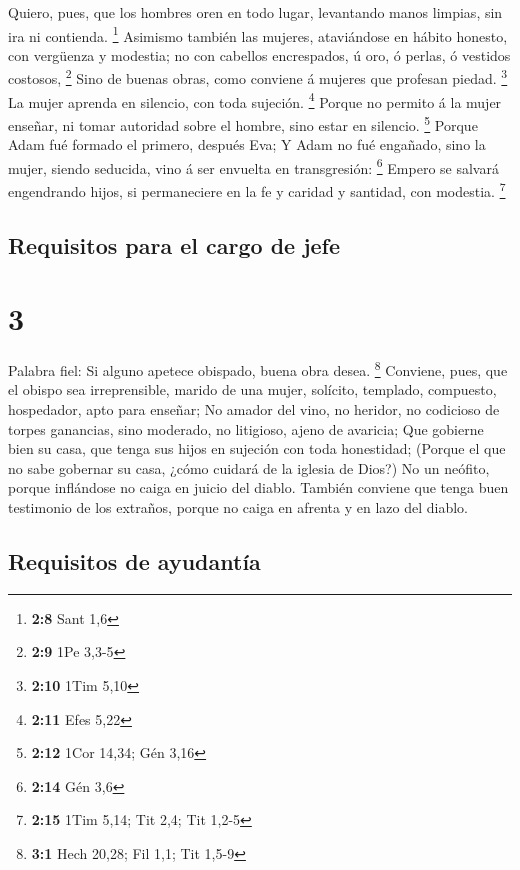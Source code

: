  Quiero, pues, que los hombres oren en todo lugar,
levantando manos limpias, sin ira ni contienda. \footnote{\textbf{2:8}
  Sant 1,6}  Asimismo también las mujeres, ataviándose en
hábito honesto, con vergüenza y modestia; no con cabellos encrespados, ú
oro, ó perlas, ó vestidos costosos, \footnote{\textbf{2:9} 1Pe 3,3-5}
 Sino de buenas obras, como conviene á mujeres que
profesan piedad. \footnote{\textbf{2:10} 1Tim 5,10}  La
mujer aprenda en silencio, con toda sujeción. \footnote{\textbf{2:11}
  Efes 5,22}  Porque no permito á la mujer enseñar, ni
tomar autoridad sobre el hombre, sino estar en silencio. \footnote{\textbf{2:12}
  1Cor 14,34; Gén 3,16}  Porque Adam fué formado el
primero, después Eva;  Y Adam no fué engañado, sino la
mujer, siendo seducida, vino á ser envuelta en transgresión: \footnote{\textbf{2:14}
  Gén 3,6}  Empero se salvará engendrando hijos, si
permaneciere en la fe y caridad y santidad, con modestia. \footnote{\textbf{2:15}
  1Tim 5,14; Tit 2,4; Tit 1,2-5}

\hypertarget{requisitos-para-el-cargo-de-jefe}{%
\subsection{Requisitos para el cargo de
jefe}\label{requisitos-para-el-cargo-de-jefe}}

\hypertarget{section-2}{%
\section{3}\label{section-2}}

 Palabra fiel: Si alguno apetece obispado, buena obra
desea. \footnote{\textbf{3:1} Hech 20,28; Fil 1,1; Tit 1,5-9}
 Conviene, pues, que el obispo sea irreprensible, marido
de una mujer, solícito, templado, compuesto, hospedador, apto para
enseñar;  No amador del vino, no heridor, no codicioso de
torpes ganancias, sino moderado, no litigioso, ajeno de avaricia;
 Que gobierne bien su casa, que tenga sus hijos en
sujeción con toda honestidad;  (Porque el que no sabe
gobernar su casa, ¿cómo cuidará de la iglesia de Dios?) 
No un neófito, porque inflándose no caiga en juicio del diablo.
 También conviene que tenga buen testimonio de los
extraños, porque no caiga en afrenta y en lazo del diablo.

\hypertarget{requisitos-de-ayudantuxeda}{%
\subsection{Requisitos de ayudantía}\label{requisitos-de-ayudantuxeda}}

